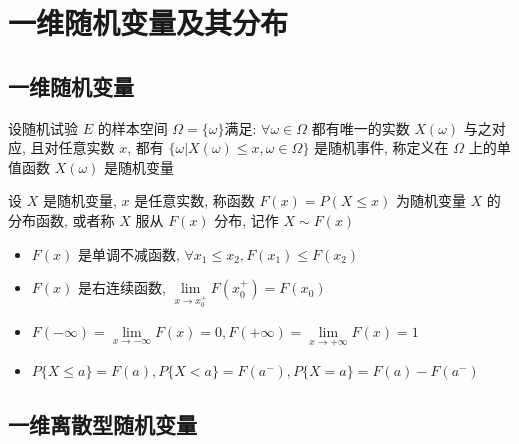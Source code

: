 \chapter{一维随机变量及其分布}

\section{一维随机变量}
\begin{definition}[随机变量]
	设随机试验 $E$ 的样本空间 $\Omega=\{\omega\}$满足: 
	$\forall \omega \in\Omega$ 都有唯一的实数 $X(\omega)$ 与之对应, 且对任意实数 $x$, 都有 $\{\omega|X(\omega)\leq x,\omega\in\Omega\}$ 是随机事件,
	称定义在 $\Omega$ 上的单值函数 $X(\omega)$ 是随机变量
\end{definition}
\begin{definition}[分布函数]
	设 $X$ 是随机变量, $x$ 是任意实数, 称函数 $F(x) = P(X\leq x)$ 为随机变量 $X$ 的分布函数, 或者称 $X$ 服从 $F(x)$ 分布, 记作 $X\sim F(x)$
\end{definition}

\begin{corollary}[分布函数性质]
	\begin{itemize}
		\item $F(x)$ 是单调不减函数, $\forall x_{1}\leq x_{2}, F(x_{1})\leq F(x_{2})$
		\item $F(x)$ 是右连续函数, $\lim\limits_{x\to x_{0}^{+}}F(x_{0}^{+}) = F(x_{0})$
		\item $F(-\infty) = \lim\limits_{x\to -\infty}F(x) = 0, F(+\infty) = \lim\limits_{x\to +\infty}F(x) = 1$
		\item $P\{X\leq a\} = F(a), P\{X < a\} = F(a^{-}), P\{X = a\} = F(a) - F(a^{-})$
	\end{itemize}
\end{corollary}

\section{一维离散型随机变量}

